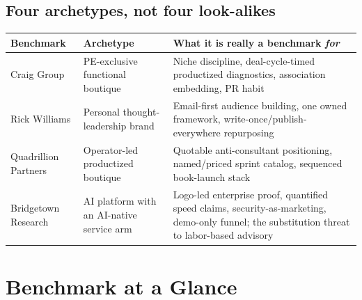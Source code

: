 \documentclass[11pt]{article}
\begin{document}
\subsection{Four archetypes, not four look-alikes}
\begin{center}
\renewcommand{\arraystretch}{1.3}
\begin{tabular}{R{3.2cm} R{4.2cm} R{6.0cm}}
\toprule
\textbf{Benchmark} & \textbf{Archetype} & \textbf{What it is really a benchmark \emph{for}} \\
\midrule
Craig Group & PE-exclusive functional boutique & Niche discipline, deal-cycle-timed
productized diagnostics, association embedding, PR habit \\
Rick Williams & Personal thought-leadership brand & Email-first audience building, one
owned framework, write-once/publish-everywhere repurposing \\
Quadrillion Partners & Operator-led productized boutique & Quotable anti-consultant
positioning, named/priced sprint catalog, sequenced book-launch stack \\
Bridgetown Research & AI platform with an AI-native service arm & Logo-led enterprise
proof, quantified speed claims, security-as-marketing, demo-only funnel; the
substitution threat to labor-based advisory \\
\bottomrule
\end{tabular}
\end{center}

\clearpage
\section{Benchmark at a Glance}
\end{document}
